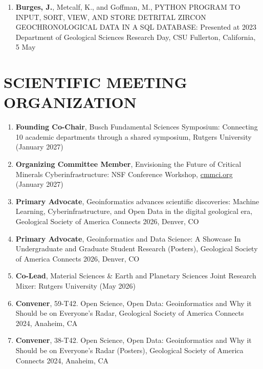 \documentclass{res} %
\newcommand\reverselabel[1]{%
  \def\theenumi{}%
  \renewcommand\makelabel[1]{%
    \def\tmp{##1}%
    \ifx\tmp\empty
      \null
    \else
      \makebox[\dimexpr\labelwidth-3pt\relax][r]{%
        \the\numexpr#1-\value{enumi}+1\relax.}%
    \fi}}
\begin{document}
\begin{resume}
\begin{enumerate}
\item \textbf{Burges, J.}, Metcalf, K., and Goffman, M., PYTHON PROGRAM TO INPUT, SORT, VIEW, AND STORE DETRITAL ZIRCON GEOCHRONOLOGICAL DATA IN A SQL DATABASE: Presented at 2023 Department of Geological Sciences Research Day, CSU Fullerton, California, 5 May

\end{enumerate}



\section{\Large{SCIENTIFIC MEETING ORGANIZATION}} 
\begin{enumerate}
\reverselabel{7}
    \item \textbf{Founding Co-Chair}, Busch Fundamental Sciences Symposium: Connecting 10 academic departments through a shared symposium, Rutgers University (January 2027) 

    \item \textbf{Organizing Committee Member}, Envisioning the Future of Critical Minerals Cyberinfrastructure: NSF Conference Workshop, \href{https://cmmci.org}{cmmci.org} (January 2027) 
    
    \item \textbf{Primary Advocate}, Geoinformatics advances scientific discoveries: Machine Learning, Cyberinfrastructure, and Open Data in the digital geological era, Geological Society of America Connects 2026, Denver, CO
    \item \textbf{Primary Advocate}, Geoinformatics and Data Science: A Showcase In Undergraduate and Graduate Student Research (Posters), Geological Society of America Connects 2026, Denver, CO
    
    \item \textbf{Co-Lead}, Material Sciences \& Earth and Planetary Sciences Joint Research Mixer: Rutgers University (May 2026) 

    \item \textbf{Convener}, 59-T42. Open Science, Open Data: Geoinformatics and Why it Should be on Everyone’s Radar, Geological Society of America Connects 2024, Anaheim, CA
    \item \textbf{Convener}, 38-T42. Open Science, Open Data: Geoinformatics and Why it Should be on Everyone’s Radar (Posters), Geological Society of America Connects 2024, Anaheim, CA
    

\end{enumerate}
\end{resume}
\end{document}
